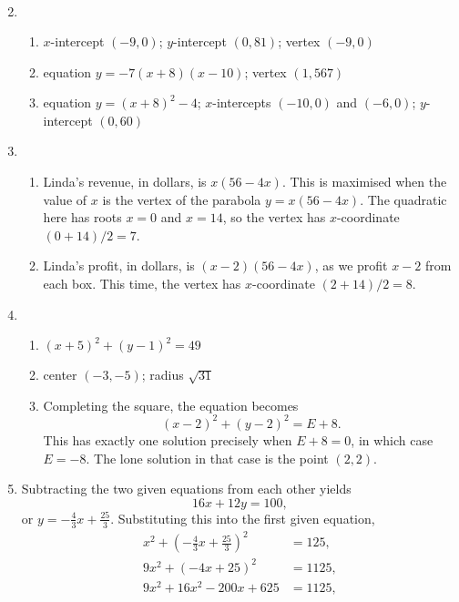 \begin{enumerate}
\begin{enumerate}
\begin{align*}
\end{align*}
\end{enumerate}
\item \begin{enumerate}
\item $x$-intercept $(-9,0)$; $y$-intercept $(0,81)$; vertex $(-9,0)$
\item equation $y = -7(x + 8)(x - 10)$; vertex $(1, 567)$
\item equation $y = (x + 8)^2 - 4$; $x$-intercepts $(-10,0)$ and $(-6,0)$; $y$-intercept $(0,60)$
\end{enumerate}
\item \begin{enumerate}
\item Linda's revenue, in dollars, is $x(56 - 4x)$. This is maximised when the value of $x$ is the vertex of the parabola $y = x(56 - 4x)$. The quadratic here has roots $x = 0$ and $x = 14$, so the vertex has $x$-coordinate $(0 + 14)/2 = \boxed{7}$.
\item Linda's profit, in dollars, is $(x - 2)(56 - 4x)$, as we profit $x - 2$ from each box. This time, the vertex has $x$-coordinate $(2 + 14)/2 = \boxed{8}$.
\end{enumerate}
\item \begin{enumerate}
\item $(x + 5)^2 + (y - 1)^2 = 49$
\item center $(-3, -5)$; radius $\sqrt{31}$
\item Completing the square, the equation becomes
\begin{equation*}
(x - 2)^2 + (y - 2)^2 = E + 8.
\end{equation*}
This has exactly one solution precisely when $E + 8 = 0$, in which case $\boxed{E = -8}$. The lone solution in that case is the point $\boxed{(2,2)}$.
\end{enumerate}
\item Subtracting the two given equations from each other yields
\begin{equation*}
16x + 12y = 100, \tag{$\dagger$}
\end{equation*}
or $y = -\frac{4}{3}x + \frac{25}{3}$. Substituting this into the first given equation,
\begin{align*} 
x^2 + \left(-\frac{4}{3}x + \frac{25}{3}\right)^2 &= 125, \\
9x^2 + (-4x + 25)^2 &= 1125, \\
9x^2 + 16x^2 - 200x + 625 &= 1125, \\

\end{align*}
\end{enumerate}
